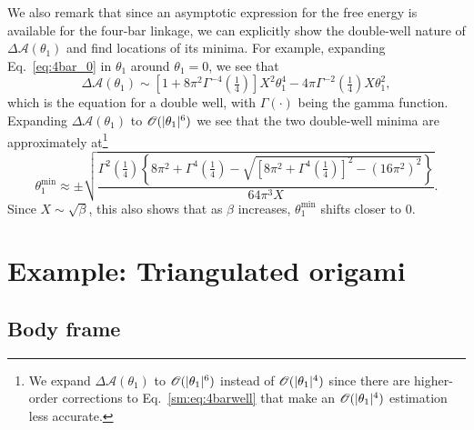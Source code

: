 We also remark that since an asymptotic expression for the free energy is available for the four-bar linkage, we can explicitly show the double-well nature of $\Delta\mathscr{A}(\theta_{1})$ and find locations of its minima.
For example, expanding Eq.~\eqref{eq:4bar_0} in $\theta_{1}$ around $\theta_{1} = 0$, we see that
%
\begin{equation}
  \Delta\mathscr{A}(\theta_{1}) \sim \left[1 + 8\pi^{2}\Gamma^{-4}\left(\tfrac{1}{4}\right)\right]X^{2}\theta_{1}^{4} - 4\pi\Gamma^{-2}\left(\tfrac{1}{4}\right)X\theta_{1}^{2},\label{sm:eq:4barwell}
\end{equation}
%
which is the equation for a double well, with $\Gamma(\cdot)$ being the gamma function.
Expanding $\Delta\mathscr{A}(\theta_{1})$ to $\mathscr{O}(\lvert\theta_{1}\rvert^{6})$ we see that the two double-well minima are approximately at\footnote{We expand $\Delta\mathscr{A}(\theta_{1})$ to $\mathscr{O}(\lvert\theta_{1}\rvert^{6})$ instead of $\mathscr{O}(\lvert\theta_{1}\rvert^{4})$ since there are higher-order corrections to Eq.~\eqref{sm:eq:4barwell} that make an $\mathscr{O}(\lvert\theta_{1}\rvert^{4})$ estimation less accurate.}
%
\begin{equation}
  \theta_{1}^{\text{min}} \approx \pm \sqrt{\frac{\Gamma^{2}\left(\frac{1}{4}\right)\left\{8\pi^{2} + \Gamma^{4}\left(\frac{1}{4}\right) - \sqrt{\left[8\pi^{2} + \Gamma^{4}\left(\frac{1}{4}\right)\right]^{2} - (16\pi^{2})^{2}}\right\}}{64\pi^{3}X}}.
  \label{sm:eq:thetamin}
\end{equation}
%
Since $X \sim \sqrt{\beta}$, this also shows that as $\beta$ increases, $\theta_{1}^{\text{min}}$ shifts closer to $0$.

\section{Example: Triangulated origami}
\label{sm:sec:origami}

\subsection{Body frame}

